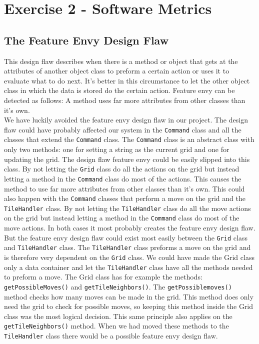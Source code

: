 \documentclass[a4paper,11pt,report]{scrartcl}
\begin{document}
\newpage\section{Exercise 2 - Software Metrics}

\subsection{The Feature Envy Design Flaw}

This design flaw describes when there is a method or object that gets at the attributes of another object class to preform a certain action or uses it to evaluate what to do next. It’s better in this circumstance to let the other object class in which the data is stored do the certain action. Feature envy can be detected as follows: A method uses far more attributes from other classes than it’s own.\\

We have luckily avoided the feature envy design flaw in our project. The design flaw could have probably affected our system in the \texttt{Command} class and all the classes that extend the \texttt{Command} class. The \texttt{Command} class is an abstract class with only two methods: one for setting a string as the current grid and one for updating the grid. The design flaw feature envy could be easily slipped into this class. 
By not letting the \texttt{Grid} class do all the actions on the grid but instead letting a method in the \texttt{Command} class do most of the actions. This causes the method to use far more attributes from other classes than it’s own. 
This could also happen with the \texttt{Command} classes that perform a move on the grid and the \texttt{TileHandler} class. By not letting the \texttt{TileHandler} class do all the move actions on the grid but instead letting a method in the \texttt{Command} class do most of the move actions. 
In both cases it most probably creates the feature envy design flaw.\\

But the feature envy design flaw could exist most easily between the \texttt{Grid} class and \texttt{TileHandler} class. The \texttt{TileHandler} class preforms a move on the grid and is therefore very dependent on the \texttt{Grid} class. We could have made the Grid class only a data container and let the \texttt{TileHandler} class have all the methods needed to preform a move. The Grid class has for example the methods: \texttt{getPossibleMoves()} and \texttt{getTileNeighbors()}.  The \texttt{getPossiblemoves()} method checks how many moves can be made in the grid. This method does only need the grid to check for possible moves, so keeping this method inside the Grid class was the most logical decision. This same principle also applies on the \texttt{getTileNeighbors()} method.
When we had moved these methods to the \texttt{TileHandler} class there would be a possible feature envy design flaw. \\
\end{document}

